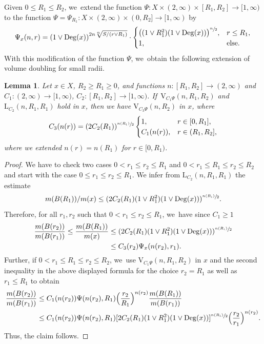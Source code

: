 \documentclass[10pt]{amsart}
\newcommand{\rV}{\mathrm{V}}
\newcommand{\rL}{\mathrm{L}}
\theoremstyle{plain}
\newtheorem{lemma}[theorem]{Lemma}
\theoremstyle{definition}
\DeclareMathOperator{\Deg}{Deg}
\begin{document}
Given $0\leq R_1\leq R_2$, we~extend the function
$\Psi\colon X\times (2,\infty)\times [R_1,R_2]\to[1,\infty)$ to the function $\Psi=\Psi_{R_1}\colon X\times (2,\infty)\times(0,R_2]\to[1,\infty)$ by
\[
\Psi_x(n,r)
=\left(1\vee\Deg(x)\right)^{{2}n\sqrt[n]{S/(r\vee R_1)}}
\cdot\begin{cases}
\bigl((1\vee R_1^{2})(1\vee\Deg(x))\bigr)^{\sfrac{n}{2}},& r\leq R_1,
\\
1,& \text{else.}
\end{cases}
\]
With this modification of the function {$\Psi$}, we~obtain the following extension of volume doubling for small radii.
\begin{lemma}\label{lem:fulldoubling}
Let $x\in X$, $R_2\geq R_1\geq 0$, and functions $n:[R_{1},R_{2}]\to (2,\infty)$ and {$ C_1\colon (2,\infty)\to[1,\infty)$, $C_2\colon [R_1,R_2]\to[1,\infty) $}. If~$\rV_{C_1\Psi}(n,R_1,R_2) $ and {$\rL_{C_2}(n,R_1,R_1)$} hold in $x$, then we have $\rV_{C_3\Psi}(n,R_2)$ in $x$, where
\[
C_3(n(r))=(2C_2(R_1))^{\sfrac{n(R_1)}2}
\begin{cases}
1,& r\in[0,R_1],
\\
C_1(n(r)),& r\in(R_1,R_2],
\end{cases}
\]
where we extended $ n(r)=n(R_{1}) $ for $ r\in [0,R_{1}) $.
\end{lemma}
\begin{proof}
We have to check two cases $0<r_1\leq r_2\leq R_1$ and $0< r_1\leq R_1\leq r_2\leq R_2$ and start with the case $0\leq r_1\leq r_2\leq R_1$.
We infer from {$\rL_{C_2}(n,R_1,R_1)$} the estimate
\[
m(B(R_1))/{m(x)}\leq (2C_2(R_1)(1\vee R_1^2)(1\vee \Deg(x)))^{\sfrac{n(R_1)}{2}}.
\]
Therefore, for all $r_1,r_2$ such that $0< r_1\leq r_2\leq R_1$, we~have {since $C_1\ge 1$}
\begin{align*}
\frac{m(B(r_2))}{m(B(r_1))}\leq \frac{m(B(R_1))}{m(x)}&\leq
(2C_2(R_1)(1\vee R_{1}^{2})(1\vee\Deg(x)))^{\sfrac{n(R_1)}{2}}\\
&\leq C_3(r_2)\Psi_{x}(n(r_2),r_1).
\end{align*}
Further, if $0<r_1\leq R_1\leq r_2\leq R_2$, we~use $\rV_{C_1{\Psi}}(n,R_1,R_2)$ in $x$ and the second inequality in the above displayed formula for the choice $r_2=R_1$ as well as $r_1\leq R_1$ to obtain
\begin{align*}
\frac{m(B(r_2))}{m(B(r_1))}
&\leq
C_{1}(n(r_2)){\Psi}(n(r_2),R_1)\Bigl(\frac{r_2}{R_1}\Bigr)^{n(r_2)}\frac{m(B(R_1))}{m(B(r_1))}
\\
&\leq
C_{1}(n(r_2))\Psi(n(r_2),R_1)[2C_2(R_1)(1\vee R_1^2)(1\vee\Deg(x))]^{\sfrac{n(R_1)}{2}}\Bigl(\frac{r_2}{r_1}\Bigr)^{n(r_2)}.
\end{align*}
Thus, the claim follows.
\end{proof}
\end{document}
